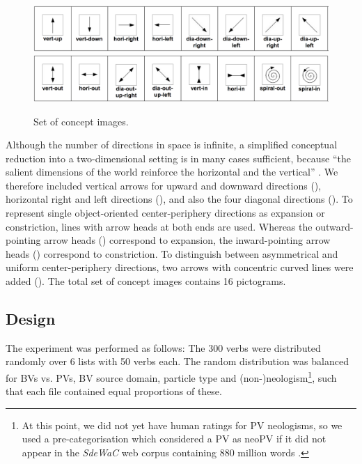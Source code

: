 \documentclass[output=paper]{langsci/langscibook}
\begin{document}
\begin{figure}
  \caption{Set of concept images.}
  \label{fig:CIdir}
  \hspace*{+1mm}\includegraphics[width=.95\linewidth]{figures/CIs-1-8.png}
  \vspace{+3mm}\\
  \includegraphics[width=.95\linewidth]{figures/CIs-9-16}
\end{figure}

Although the number of directions in space is infinite, a simplified
conceptual reduction into a two-dimensional setting is in many cases
sufficient, because ``the salient dimensions of the world reinforce
the horizontal and the vertical'' \citep{Tversky:11}. We therefore
included vertical arrows for upward and downward directions
(), horizontal right and left directions
(), and also the four diagonal
directions (). To represent single object-oriented center-periphery
directions as expansion or constriction, lines with arrow heads at
both ends are used. Whereas the outward-pointing arrow heads
()
correspond to expansion, the inward-pointing arrow heads
() correspond to constriction. To distinguish
between asymmetrical and uniform center-periphery directions, two
arrows with concentric curved lines were added (). The total set of concept images contains 16 pictograms.


\subsection{Design}
\label{sec:design}

The experiment was performed as follows: The 300 verbs were
distributed randomly over 6 lists with 50 verbs each. The random
distribution was balanced for BVs vs. PVs, BV source domain, particle
type and (non-)neologism\footnote{At this point, we did not yet have
  human ratings for PV neologisms, so we used a pre-categorisation
  which considered a PV as neoPV if it did not appear in the
  \textit{SdeWaC} web corpus containing 880 million words
  \citep{Faass/Eckart:13}.}, such that each file contained equal
proportions of these.
\end{document}
